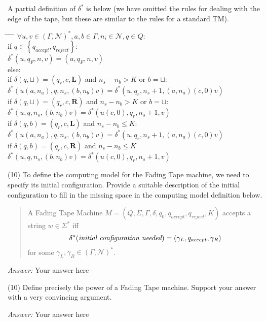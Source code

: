 \documentclass[11pt]{article}
\newenvironment{smallquote}{\vspace*{-2ex}\begin{list}{}{%
  \setlength\rightmargin{1.5em}\setlength\leftmargin{1.5em}\setlength\labelwidth{0pt}\setlength\itemindent{0pt}}\item[]}{\end{list}\vspace*{-1.3ex}}
\newcommand{\answer}[1]{\par \bigskip \begin{smallquote}\emph{Answer:} #1\end{smallquote}}
\begin{document}
A partial definition of $\delta^{*}$ is below (we have omitted the rules for dealing with the edge of the tape, but these are similar to the rules for a standard TM).

\begin{tabbing}
\hspace*{0.1in} \= \hspace*{0.1in} \= \hspace*{0.1in} \= \hspace*{0.1in} \= \kill 
$\forall u, v \in (\Gamma, \mathcal{N})^{*}, a, b \in \Gamma, n_i \in \mathcal{N}, q \in Q$:\\
\> if $q \in \left\{q_{accept}, q_{reject}\right\}$: \\
\> \> \> $\delta^{*}(u, q_{F}, n, v) = (u, q_{F}, n, v)$\\
\> else:\\
\> \> if $\delta(q, \sqcup) = (q_r, c, \textbf{L})$ and $n_s - n_b > K$ or $b = \sqcup$:\\
\> \> \> \> $\delta^{*}(u(a, n_a), q, n_s, (b, n_b)v) = \delta^{*}(u, q_r, n_s + 1, (a, n_a)(c, 0)v)$ \\
\> \> if $\delta(q, \sqcup) = (q_r, c, \textbf{R})$ and $n_s - n_b > K$ or $b = \sqcup$:\\
\> \> \> \> $\delta^{*}(u, q, n_s, (b, n_b)v) = \delta^{*}(u(c, 0), q_r, n_s + 1, v)$ \\
\> \> if $\delta(q, b) = (q_r, c, \textbf{L})$ and $n_s - n_b \le K$:\\
\> \> \> \> $\delta^{*}(u(a, n_a), q, n_s, (b, n_b)v) = \delta^{*}(u, q_r, n_s + 1, (a, n_a)(c, 0)v)$ \\
\> \> if $\delta(q, b) = (q_r, c, \textbf{R})$ and $n_s - n_b \le K$\\
\> \> \> \> $\delta^{*}(u, q, n_s, (b, n_b)v) = \delta^{*}(u(c, 0), q_r, n_s + 1, v)$\\
\end{tabbing}

\begin{enumerate}
\item (10) To define the computing model for the Fading Tape machine, we need to specify its initial configuration.  Provide a suitable description of the initial configuration to fill in the missing space in the computing model definition below.
\begin{quote}
A Fading Tape Machine $M = (Q, \Sigma, \Gamma, \delta, q_0, q_{accept}, q_{reject}, K)$ 
accepts a string $w \in \Sigma^{*}$ iff 
\[
\delta^{*}(\text{{\em initial configuration needed}}) = (\gamma_L, q_{accept}, \gamma_R)
\]
for some $\gamma_L, \gamma_R \in (\Gamma, \mathcal{N})^{*}$.
\end{quote}

\answer{Your answer here}

\item (10) Define precisely the power of a Fading Tape machine.  Support your answer with a very convincing argument.

\answer{Your answer here}

\end{enumerate}
\end{document}
